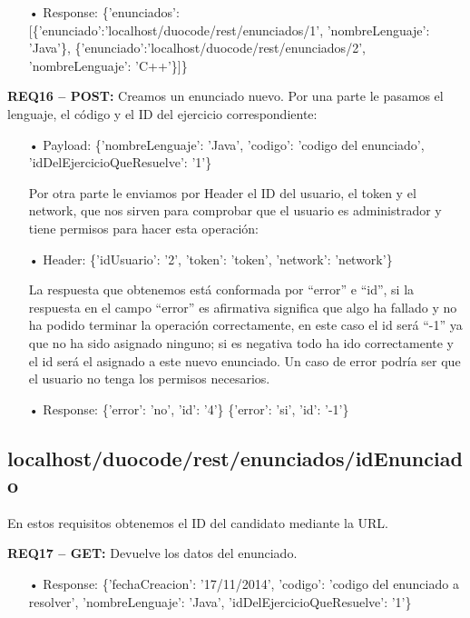 \begin{itemize}
\item[•]
Response:
\{'enunciados': [\{'enunciado':'localhost/duocode/rest/enunciados/1', 'nombreLenguaje': 'Java'\}, \{'enunciado':'localhost/duocode/rest/enunciados/2', 'nombreLenguaje': 'C++'\}]\}
\vspace{1em}

\end{itemize}

\textbf{REQ16 – POST:} Creamos un enunciado nuevo. Por una parte le pasamos el lenguaje, el código y el ID del ejercicio correspondiente:

\begin{itemize}
\item[•]
Payload: 
\{'nombreLenguaje': 'Java', 'codigo': 'codigo del enunciado', 'idDelEjercicioQueResuelve': '1'\}
\vspace{1em}

Por otra parte le enviamos por Header el ID del usuario, el token y el network, que nos sirven para comprobar que el usuario es administrador y tiene permisos para hacer esta operación:

\item[•]
Header: 
\{'idUsuario': '2', 'token': 'token', 'network': 'network'\}
\vspace{1em}

La respuesta que obtenemos está conformada por “error” e “id”, si la respuesta en el campo “error” es afirmativa significa que algo ha fallado y no ha podido terminar la operación correctamente, en este caso el id será “-1” ya que no ha sido asignado ninguno; si es negativa todo ha ido correctamente y el id será el asignado a este nuevo enunciado. Un caso de error podría ser que el usuario no tenga los permisos necesarios.

\item[•]
Response: 
\{'error': 'no', 'id': '4'\} 
\{'error': 'si', 'id': '-1'\} 
\end{itemize}

\subsection{localhost/duocode/rest/enunciados/idEnunciado}
En estos requisitos obtenemos el ID del candidato mediante la URL.
\vspace{1em}


\textbf{REQ17 – GET:} Devuelve los datos del enunciado.

\begin{itemize}
\item[•]
Response: 
\{'fechaCreacion': '17/11/2014', 'codigo': 'codigo del enunciado a resolver', 'nombreLenguaje': 'Java', 'idDelEjercicioQueResuelve': '1'\}
\end{itemize}

